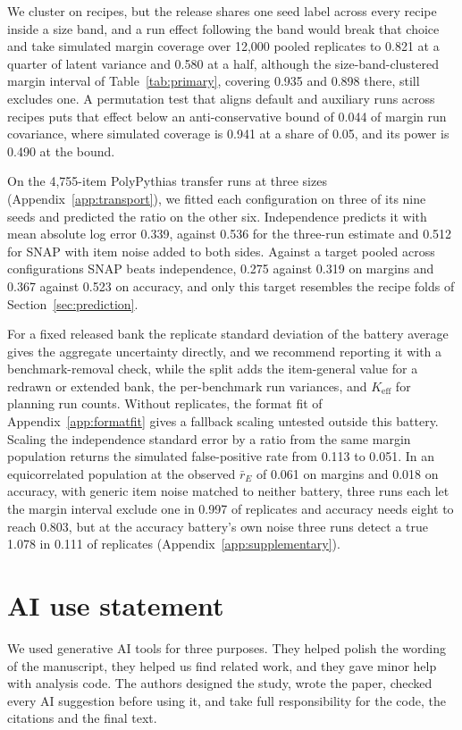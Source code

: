 We cluster on recipes, but the release shares one seed label across every recipe inside a size band, and a run effect following the band would break that choice and take simulated margin coverage over 12,000 pooled replicates to 0.821 at a quarter of latent variance and 0.580 at a half, although the size-band-clustered margin interval  of Table~\ref{tab:primary}, covering 0.935 and 0.898 there, still excludes one. A permutation test that aligns default and auxiliary runs across recipes puts that effect below an anti-conservative bound of 0.044 of margin run covariance, where simulated coverage is 0.941 at a share of 0.05, and its power is 0.490 at the bound.

On the 4,755-item PolyPythias transfer runs at three sizes (Appendix~\ref{app:transport}), we fitted each configuration on three of its nine seeds and predicted the ratio on the other six. Independence predicts it with mean absolute log error 0.339, against 0.536 for the three-run estimate and 0.512 for SNAP with item noise added to both sides. Against a target pooled across configurations SNAP beats independence, 0.275 against 0.319 on margins and 0.367 against 0.523 on accuracy, and only this target resembles the recipe folds of Section~\ref{sec:prediction}.

For a fixed released bank the replicate standard deviation of the battery average gives the aggregate uncertainty directly, and we recommend reporting it with a benchmark-removal check, while the split adds the item-general value for a redrawn or extended bank, the per-benchmark run variances, and $K_{\mathrm{eff}}$ for planning run counts. Without replicates, the format fit of Appendix~\ref{app:formatfit} gives a fallback scaling untested outside this battery. Scaling the independence standard error by a ratio from the same margin population returns the simulated false-positive rate from 0.113 to 0.051. In an equicorrelated population at the observed $\bar r_E$ of 0.061 on margins and 0.018 on accuracy, with generic item noise matched to neither battery, three runs each let the margin interval exclude one in 0.997 of replicates and accuracy needs eight to reach 0.803, but at the accuracy battery's own noise three runs detect a true 1.078 in 0.111 of replicates (Appendix~\ref{app:supplementary}).

\label{maintext:end}
\section*{AI use statement}
We used generative AI tools for three purposes. They helped polish the wording of the manuscript, they helped us find related work, and they gave minor help with analysis code. The authors designed the study, wrote the paper, checked every AI suggestion before using it, and take full responsibility for the code, the citations and the final text.

